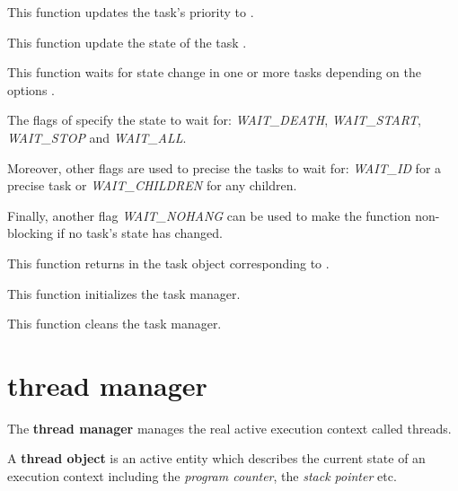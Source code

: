 	 {
	   This function updates the task's priority to .
	 }

	 {
	   This function update the state of the task .
	 }

	 {
	   This function waits for state change in one or more tasks
	   depending on the options .

	   The flags of  specify the state to wait for:
	   \textit{WAIT\_DEATH}, \textit{WAIT\_START},
	   \textit{WAIT\_STOP} and \textit{WAIT\_ALL}.

	   Moreover, other flags are used to precise the tasks to wait for:
	   \textit{WAIT\_ID} for a precise task  or
	   \textit{WAIT\_CHILDREN} for any children.

	   Finally, another flag \textit{WAIT\_NOHANG} can be used
	   to make the function non-blocking if no task's state has changed.


	 }

	 {
	   This function returns in  the task object corresponding
	   to .
	 }

	 {
	   This function initializes the task manager.
	 }

	 {
	   This function cleans the task manager.
	 }

%
%

\section{thread manager}

The \textbf{thread manager} manages the real active execution context
called threads.

A \textbf{thread object} is an active entity which describes the
current state of an execution context including the \textit{program counter},
the \textit{stack pointer} etc.

